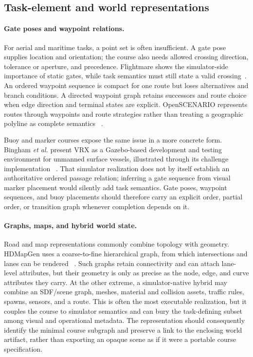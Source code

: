 \subsection{Task-element and world representations}

\paragraph{Gate poses and waypoint relations.}
For aerial and maritime tasks, a point set is often insufficient. A gate pose supplies location and orientation; the course also needs allowed crossing direction, tolerance or aperture, and precedence. Flightmare shows the simulator-side importance of static gates, while task semantics must still state a valid crossing~\cite{Song2021FlightmareFlexible}. An ordered waypoint sequence is compact for one route but loses alternatives and branch conditions. A directed waypoint graph retains successors and route choice when edge direction and terminal states are explicit. OpenSCENARIO represents routes through waypoints and route strategies rather than treating a geographic polyline as complete semantics
~\cite{ASAM2024ASAMOpenSCENARIO}.

Buoy and marker courses expose the same issue in a more concrete form. Bingham
\emph{et al.} present VRX as a Gazebo-based development and testing environment for
unmanned surface vessels, illustrated through its challenge implementation
~\cite{Bingham2019TowardMaritime}. That simulator realization does not by itself
establish an authoritative ordered passage relation; inferring a gate sequence from
visual marker placement would silently add task semantics. Gate poses, waypoint
sequences, and buoy placements should therefore carry an explicit order, partial
order, or transition graph whenever completion depends on it.

\paragraph{Graphs, maps, and hybrid world state.}
Road and map representations commonly combine topology with geometry. HDMapGen uses a
coarse-to-fine hierarchical graph, from which intersections and lanes can be rendered
~\cite{Mi2021HDMapGenHierarchical}. Such graphs retain connectivity and can attach
lane-level attributes, but their geometry is only as precise as the node, edge, and
curve attributes they carry. At the other extreme, a simulator-native hybrid may
combine an SDF/scene graph, meshes, material and collision assets, traffic rules,
spawns, sensors, and a route. This is often the most executable realization, but it
couples the course to simulator semantics and can bury the task-defining subset among
visual and operational metadata. The representation should consequently identify the
minimal course subgraph and preserve a link to the enclosing world artifact, rather
than exporting an opaque scene as if it were a portable course specification.

